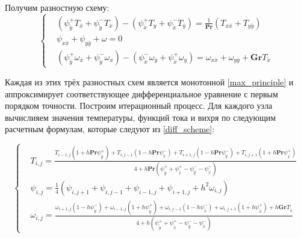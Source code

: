 \documentclass[a4paper, 12pt]{article}
\newcommand{\Pra}{\mathbf{Pr}}
\newcommand{\Gra}{\mathbf{Gr}}
\newcommand{\psp}[2]{\psi_{\mathring{#1}}^{#2}}
\begin{document}
    Получим разностную схему:
    \begin{equation}
      \left\{
        \begin{aligned}
          &\left( \psp{y}{+} T_{\overline{x}} + \psp{y}{-} T_{x} \right) -
            \left( \psp{x}{+} T_{y} + \psp{x}{-} T_{\overline{y}} \right) =
            \frac{1}{\Pra}\left( T_{x \overline{x}} + T_{y \overline{y}} \right)
          \\
          &\psi_{x \overline{x}} + \psi_{y \overline{y}} + \omega = 0
          \\
          &\left(
            \psp{y}{+} \omega_{\overline{x}} + \psp{y}{-} \omega_{x}
          \right) - \left(
            \psp{x}{-} \omega_{\overline{y}} + \psp{x}{+} \omega_{y}
          \right) =
            \omega_{x \overline{x}} + \omega_{y \overline{y}} +
            \Gra T_{\mathring{x}}
        \end{aligned}
      \right.\label{diff_scheme}
    \end{equation}

    Каждая из этих трёх разностных схем является монотонной
    \eqref{max_principle} и аппроксимирует соответствующее дифференциальное
    уравнение с первым порядком точности. Построим итерационный процесс. Для
    каждого узла вычислияем значения температуры, функций тока и вихря по
    следующим расчетным формулам, которые следуют из \eqref{diff_scheme}:

    \begin{equation}
      \left\{
        \begin{aligned}
          &T_{i,j} =
            \frac{
              T_{i-1,j}\left(
                1 + h \Pra \psp{y}{+}
              \right) +
              T_{i,j-1}\left(
                1 - h \Pra \psp{x}{-}
              \right) +
              T_{i+1,j}\left(
                1 - h \Pra \psp{y}{-}
              \right) +
              T_{i,j+1}\left(
                1 + h \Pra \psp{x}{+}
              \right)
            }{4 + h \Pra \left(
              \psp{y}{+} + \psp{x}{+} - \psp{y}{-} - \psp{x}{-}
            \right)}
          \\
          &\psi_{i,j} = \frac{1}{4} \left(
            \psi_{i,j+1} + \psi_{i,j-1} + \psi_{i-1,j} + \psi_{i+1,j} +
            h^2 \omega_{i,j}
          \right)
          \\
          &\omega_{i,j} =
            \frac{
              \omega_{i+1, j} \left( 1 - h \psp{y}{-} \right) +
              \omega_{i-1, j} \left( 1 + h \psp{y}{+} \right) +
              \omega_{i, j-1} \left( 1 - h \psp{x}{-} \right) +
              \omega_{i, j+1} \left( 1 + h \psp{x}{+} \right) +
              h \Gra T_{\mathring{x}}
            }{4 + h \left(
              \psp{y}{+} + \psp{x}{+} - \psp{y}{-} - \psp{x}{-}
            \right)}
        \end{aligned}
      \right.
    \end{equation}
\end{document}
